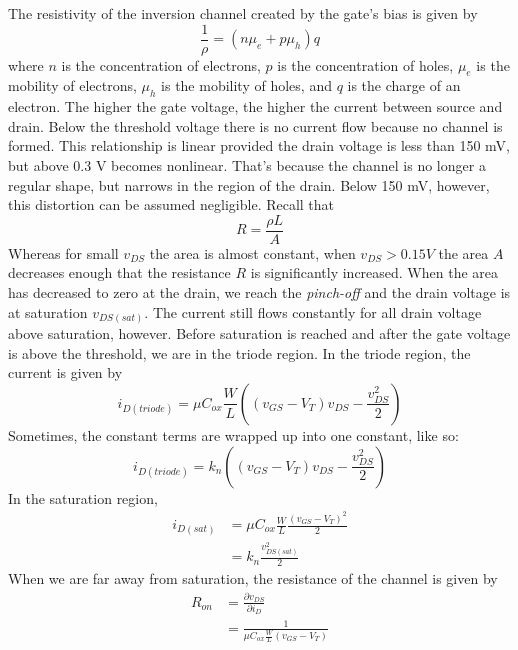 \documentclass[nobib]{tufte-handout}
\begin{document}
The resistivity of the inversion channel created by the gate's bias
is given by 
\begin{equation} \label{eq:3}
    \frac{1}{\rho} = (n\mu_e + p\mu_h)q
\end{equation}
where $n$ is the concentration of electrons, 
$p$ is the concentration of holes, $\mu_e$ is
the mobility of electrons, $\mu_h$ is the 
mobility of holes, and $q$ is the charge of an electron. 
The higher the gate voltage, the higher the current between source and drain. 
Below the threshold voltage there is no current flow because no 
channel is formed. This relationship is linear provided the drain voltage 
is less than 150 mV, but above 0.3 V becomes nonlinear. That's because 
the channel is no longer a regular shape, but narrows in the region of the 
drain. Below 150 mV, however, this distortion can be assumed negligible. 
Recall that 
\begin{equation} \label{4}
    R = \frac{\rho L}{A}
\end{equation}
Whereas for small $v_{DS}$ the area is almost constant, 
when $v_{DS} > 0.15 V$ the area $A$ decreases enough that 
the resistance $R$ is significantly increased. When the area has 
decreased to zero at the drain, we reach the \emph{pinch-off} and 
the drain voltage is at saturation $v_{DS(sat)}$. The current still 
flows constantly for all drain voltage above saturation, however. 
Before saturation is reached and after the gate voltage is above the threshold, 
we are in the triode region. In the triode region, the current is given by 
\begin{equation} \label{eq:5}
    i_{D(triode)} = \mu C_{ox} \frac{W}{L} ((v_{GS}-V_T)v_{DS}-\frac{v^2_{DS}}{2})
\end{equation}
Sometimes, the constant terms are wrapped up into 
one constant, like so:
\begin{equation} \label{eq:6}
    i_{D(triode)} = k_n ((v_{GS}-V_T)v_{DS}-\frac{v^2_{DS}}{2})
\end{equation}
In the saturation region, 
\begin{align} \label{eq:7}
    i_{D(sat)} &= \mu C_{ox} \frac{W}{L} \frac{(v_{GS}-V_T)^2}{2} \\
    &= k_n \frac{v^2_{DS(sat)}}{2}
\end{align}
When we are far away from saturation, 
the resistance of the channel is given by 
\begin{align} \label{eq:8}
    R_{on} &= \frac{\partial v_{DS}}{\partial i_D} \\
    &= \frac{1}{\mu C_{ox} \frac{W}{L} (v_{GS} - V_T)}
\end{align}
\end{document}

